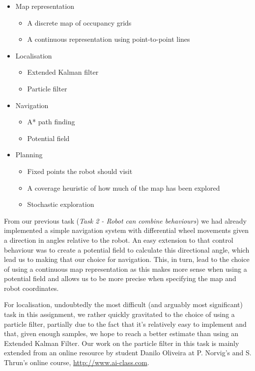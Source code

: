 \documentclass[paper=a4, fontsize=12pt]{scrartcl}	%
\numberwithin{equation}{section}		%
\numberwithin{figure}{section}			%
\numberwithin{table}{section}				%
\begin{document}
\begin{itemize}
\item Map representation 
\begin{itemize}
\item A discrete map of occupancy grids
\item A continuous representation using point-to-point lines
\end{itemize}
\item Localisation
\begin{itemize}
\item Extended Kalman filter
\item Particle filter
\end{itemize}
\item Navigation
\begin{itemize}
\item A* path finding
\item Potential field
\end{itemize}
\item Planning
\begin{itemize}
\item Fixed points the robot should visit
\item A coverage heuristic of how much of the map has been explored
\item Stochastic exploration
\end{itemize}
\end{itemize}

From our previous task (\emph{Task 2 - Robot can combine behaviours}) we had already implemented a simple navigation system with differential wheel movements given a direction in angles relative to the robot. An easy extension to that control behaviour was to create a potential field to calculate this directional angle, which lead us to making that our choice for navigation. This, in turn, lead to the choice of using a continuous map representation as this makes more sense when using a potential field and allows us to be more precise when specifying the map and robot coordinates.

For localisation, undoubtedly the most difficult (and arguably most significant) task in this assignment, we rather quickly gravitated to the choice of using a particle filter, partially due to the fact that it's relatively easy to implement and that, given enough samples, we hope to reach a better estimate than using an Extended Kalman Filter. Our work on the particle filter in this task is mainly extended from an online resource by student Danilo Oliveira at P. Norvig's and S. Thrun's online course, \url{http://www.ai-class.com}. \cite{oliveira}\cite{aiclass}
\end{document}
